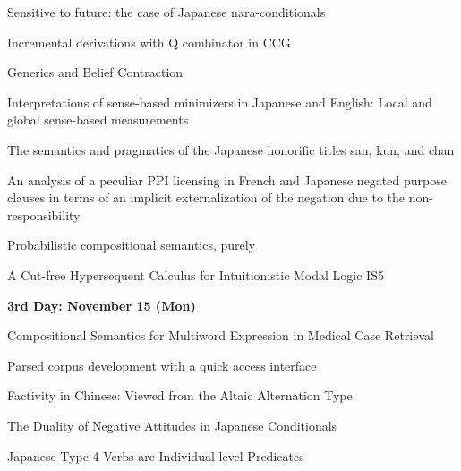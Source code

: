 \documentclass[12pt]{jarticle}
\begin{document}
  
      {Sensitive to future: the case of Japanese nara-conditionals}
      {}
  
      {Incremental derivations with Q combinator in CCG}
      {}
  
      {Generics and Belief Contraction}
      {}




  
      {Interpretations of sense-based minimizers in Japanese and English: Local and global sense-based measurements}
      {}
  
      {The semantics and pragmatics of the Japanese honorific titles san, kun, and chan}
      {}
  
      {An analysis of a peculiar PPI licensing in French and Japanese negated purpose clauses in terms of an implicit externalization of the negation due to the non-responsibility}
      {}




  
      {Probabilistic compositional semantics, purely}
      {}
  
  
      {A Cut-free Hypersequent Calculus for Intuitionistic Modal Logic IS5}
      {}




\noindent\textbf{\large 
3rd Day: November 15 (Mon)
}\\




  
      {Compositional Semantics for Multiword Expression in Medical Case Retrieval}
      {}
  
      {Parsed corpus development with a quick access interface}
      {}
  
      {Factivity in Chinese: Viewed from the Altaic Alternation Type}
      {}

  


  
      {The Duality of Negative Attitudes in Japanese Conditionals}
      {}
  
      {Japanese Type-4 Verbs are Individual-level Predicates}
      {}
  
\end{document}
